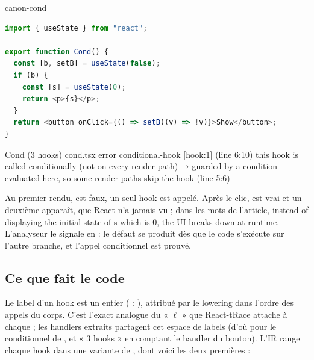 \begin{exemple}{}{canon-cond}
\begin{lstlisting}[language=TypeScript,caption={\code{Cond}, transcrit de React-tRace (\file{/tmp/ch02/cond.tsx})},label={lst:react-modele-cond}]
import { useState } from "react";

export function Cond() {
  const [b, setB] = useState(false);
  if (b) {
    const [s] = useState(0);
    return <p>{s}</p>;
  }
  return <button onClick={() => setB((v) => !v)}>Show</button>;
}
\end{lstlisting}
\begin{sortie}
  Cond  (3 hooks)  cond.tsx
    error  conditional-hook  [hook:1]  (line 6:10)  this hook is called conditionally (not on every render path)
       → guarded by a condition evaluated here, so some render paths skip the hook (line 5:6)
\end{sortie}
\end{exemple}

Au premier rendu,  est faux, un seul hook est appelé. Après le clic,
 est vrai et un deuxième  apparaît, que React n'a jamais
vu ; dans les mots de l'article, \og instead of displaying the initial state of
s which is 0, the UI breaks down at runtime\fg{}. L'analyseur le signale en
\Error{} : le défaut se produit dès que le code s'exécute sur l'autre branche,
et l'appel conditionnel est prouvé.

\subsection{Ce que fait le code}

Le label d'un hook est un entier ( :
), attribué par le lowering dans l'ordre des
appels du corps. C'est l'exact analogue du « $\ell$ » que React-tRace attache
à chaque  ; les handlers extraits partagent cet espace de
labels (d'où \code{[hook:1]} pour le  conditionnel de
, et « 3 hooks » en comptant le handler du bouton). L'IR range
chaque hook dans une variante de , dont voici les deux
premières :


